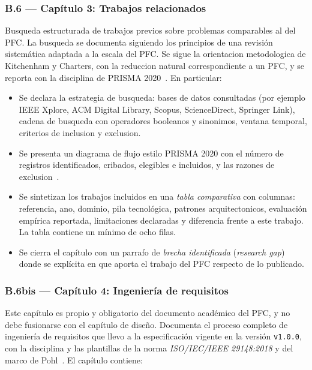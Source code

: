 \documentclass[11pt,a4paper]{article}
\begin{document}
\subsubsection*{B.6 --- Cap\'{i}tulo 3: Trabajos relacionados}

Busqueda estructurada de trabajos previos sobre problemas comparables al del PFC. La busqueda se documenta siguiendo los principios de una revisi\'{o}n sistem\'{a}tica adaptada a la escala del PFC. Se sigue la orientacion metodologica de Kitchenham y Charters, con la reduccion natural correspondiente a un PFC, y se reporta con la disciplina de PRISMA 2020~\cite{kitchenham2007guidelines,page2021prisma}. En particular:

\begin{itemize}
    \item Se declara la estrategia de busqueda: bases de datos consultadas (por ejemplo IEEE Xplore, ACM Digital Library, Scopus, ScienceDirect, Springer Link), cadena de busqueda con operadores booleanos y sinonimos, ventana temporal, criterios de inclusion y exclusion.
    \item Se presenta un diagrama de flujo estilo PRISMA 2020 con el n\'{u}mero de registros identificados, cribados, elegibles e incluidos, y las razones de exclusion~\cite{page2021prisma}.
    \item Se sintetizan los trabajos incluidos en una \emph{tabla comparativa} con columnas: referencia, ano, dominio, pila tecnol\'{o}gica, patrones arquitectonicos, evaluaci\'{o}n emp\'{i}rica reportada, limitaciones declaradas y diferencia frente a este trabajo. La tabla contiene un m\'{i}nimo de ocho filas.
    \item Se cierra el cap\'{i}tulo con un parrafo de \emph{brecha identificada} (\emph{research gap}) donde se expl\'{i}cita en que aporta el trabajo del PFC respecto de lo publicado.
\end{itemize}

\subsubsection*{B.6bis --- Cap\'{i}tulo 4: Ingenier\'{i}a de requisitos}

Este cap\'{i}tulo es propio y obligatorio del documento acad\'{e}mico del PFC, y no debe fusionarse con el cap\'{i}tulo de dise\~{n}o. Documenta el proceso completo de ingenier\'{i}a de requisitos que llevo a la especificaci\'{o}n vigente en la versi\'{o}n \texttt{v1.0.0}, con la disciplina y las plantillas de la norma \emph{ISO/IEC/IEEE 29148:2018} y del marco de Pohl~\cite{iso29148,pohl2010requirements}. El cap\'{i}tulo contiene:
\end{document}
